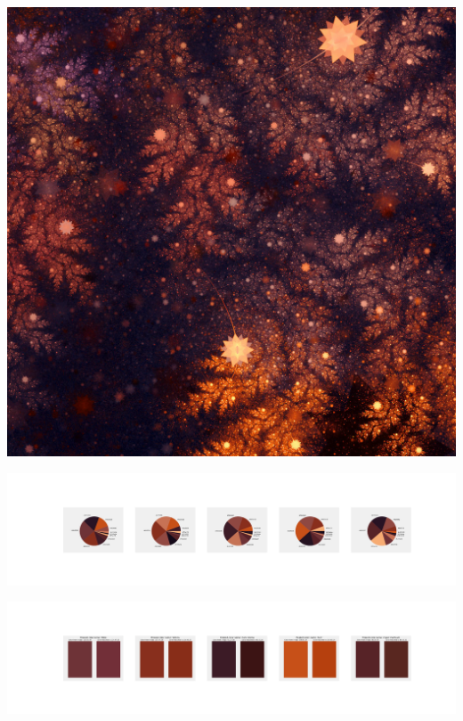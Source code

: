 \documentclass[11pt]{article}
\begin{document}
\begin{landscape}
    \begin{center}
    \includegraphics[width=\textwidth]{./nbimg/file (113).jpg}
    \end{center}

    \begin{center}
    \includegraphics[width=250mm]{./nbimg/pie-16.jpg}
    \end{center}

    \begin{center}
    \includegraphics[width=250mm]{./nbimg/peak-16.jpg}
    \end{center}
    


\end{landscape}
\end{document}
